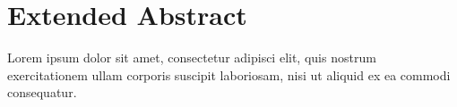 \chapter*{Extended Abstract}
\label{cha:extended_abstract}
\onehalfspace
Lorem ipsum dolor sit amet, consectetur adipisci elit, quis nostrum exercitationem ullam corporis suscipit laboriosam, nisi ut aliquid ex ea commodi consequatur.